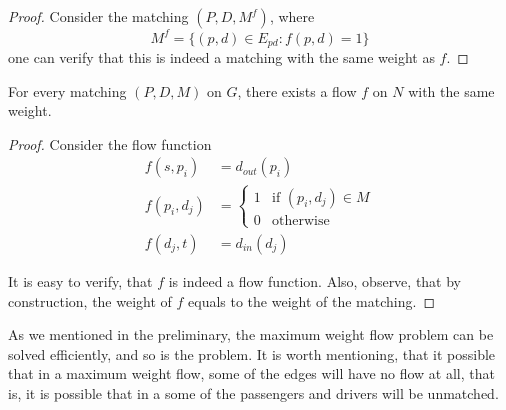 \begin{proof}
Consider the matching $(P, D, M^f)$, where 
$$ M^f = \{(p, d) \in E_{pd} : f(p, d) = 1\} $$
one can verify that this is indeed a matching with the same weight as $f$.
\end{proof}

\begin{lemma}
For every matching $(P, D, M)$ on $G$, there exists a flow $f$ on $N$ with the same weight. 
\end{lemma}

\begin{proof}
Consider the flow function
\begin{align*}
f(s, p_i)		& = d_{out}(p_i)		 				\\
f(p_i, d_j)		& = 
				\begin{cases}
				1 & \text{if } (p_i, d_j) \in M		\\
				0 & \text{otherwise}
				\end{cases}						\\
f(d_j, t) 	& = d_{in}(d_j) 
\end{align*}

It is easy to verify, that $f$ is indeed a flow function.
Also, observe, that by construction,
the weight of $f$ equals to the weight of the matching.
\end{proof}

As we mentioned in the preliminary, 
the maximum weight flow problem can be solved efficiently, 
and so is the \FIXEDCARPOOL{} problem.
It is worth mentioning, that it possible that in a maximum weight flow, 
some of the edges will have no flow at all, 
that is, it is possible that in a \FIXEDCARPOOL{}
some of the passengers and drivers will be unmatched.  